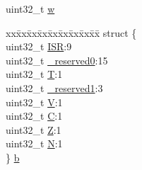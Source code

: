 \begin{DoxyCompactItemize}
\begin{tabbing}
\end{tabbing}\item 
uint32\+\_\+t \mbox{\hyperlink{unionx_p_s_r___type_ad0fb62e7a08e70fc5e0a76b67809f84b}{w}}
\item 
\begin{tabbing}
xx\=xx\=xx\=xx\=xx\=xx\=xx\=xx\=xx\=\kill
struct \{\\
\>uint32\_t \mbox{\hyperlink{unionx_p_s_r___type_ad502ba7dbb2aab5f87c782b28f02622d}{ISR}}:9\\
\>uint32\_t \mbox{\hyperlink{unionx_p_s_r___type_ac8a6a13838a897c8d0b8bc991bbaf7c1}{\_reserved0}}:15\\
\>uint32\_t \mbox{\hyperlink{unionx_p_s_r___type_a6e1cf12e53a20224f6f62c001d9be972}{T}}:1\\
\>uint32\_t \mbox{\hyperlink{unionx_p_s_r___type_a959a73d8faee56599b7e792a7c5a2d16}{\_reserved1}}:3\\
\>uint32\_t \mbox{\hyperlink{unionx_p_s_r___type_acd4a2b64faee91e4a9eef300667fa222}{V}}:1\\
\>uint32\_t \mbox{\hyperlink{unionx_p_s_r___type_a7a1caf92f32fe9ebd8d1fe89b06c7776}{C}}:1\\
\>uint32\_t \mbox{\hyperlink{unionx_p_s_r___type_a5ae954cbd9986cd64625d7fa00943c8e}{Z}}:1\\
\>uint32\_t \mbox{\hyperlink{unionx_p_s_r___type_abae0610bc2a97bbf7f689e953e0b451f}{N}}:1\\
\} \mbox{\hyperlink{unionx_p_s_r___type_a0234c929b71272c3ff0b50d83c1bb5d4}{b}}\\


\end{tabbing}
\end{DoxyCompactItemize}
